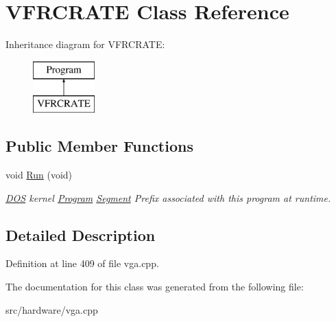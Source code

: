 \hypertarget{classVFRCRATE}{\section{V\-F\-R\-C\-R\-A\-T\-E Class Reference}
\label{classVFRCRATE}
}
Inheritance diagram for V\-F\-R\-C\-R\-A\-T\-E\-:\begin{figure}[H]
\begin{center}
\leavevmode
\includegraphics[height=2.000000cm]{classVFRCRATE}
\end{center}
\end{figure}
\subsection*{Public Member Functions}
\begin{DoxyCompactItemize}
\item 
\hypertarget{classVFRCRATE_ac9e54d65547f248ce6f97a91ebd73db2}{void \hyperlink{classVFRCRATE_ac9e54d65547f248ce6f97a91ebd73db2}{Run} (void)}\label{classVFRCRATE_ac9e54d65547f248ce6f97a91ebd73db2}

\begin{DoxyCompactList}\small\item\em \hyperlink{classDOS}{D\-O\-S} kernel \hyperlink{classProgram}{Program} \hyperlink{structSegment}{Segment} Prefix associated with this program at runtime. \end{DoxyCompactList}\end{DoxyCompactItemize}


\subsection{Detailed Description}


Definition at line 409 of file vga.\-cpp.



The documentation for this class was generated from the following file\-:\begin{DoxyCompactItemize}
\item 
src/hardware/vga.\-cpp\end{DoxyCompactItemize}
